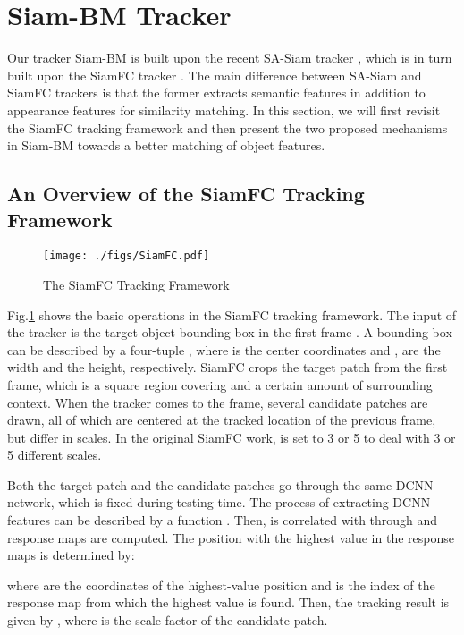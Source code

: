 \documentclass[runningheads]{llncs}
\begin{document}
\section{Siam-BM Tracker} \label{sec:Siam-BM}

Our tracker Siam-BM is built upon the recent SA-Siam tracker \cite{SASiam}, which is in turn built upon the SiamFC tracker \cite{SiamFC}. The main difference between SA-Siam and SiamFC trackers is that the former extracts semantic features in addition to appearance features for similarity matching. In this section, we will first revisit the SiamFC tracking framework and then present the two proposed mechanisms in Siam-BM towards a better matching of object features.

\subsection{An Overview of the SiamFC Tracking Framework}

\begin{figure}[th!]
    \begin{center}
    \texttt{[image: ./figs/SiamFC.pdf]}
    \end{center}
    \caption{The SiamFC Tracking Framework}
    \label{fig:siamFC}
\end{figure}

Fig.\ref{fig:siamFC} shows the basic operations in the SiamFC tracking framework. The input of the tracker is the target object bounding box  in the first frame . A bounding box can be described by a four-tuple , where  is the center coordinates and ,  are the width and the height, respectively. SiamFC crops the target patch  from the first frame, which is a square region covering  and a certain amount of surrounding context. When the tracker comes to the  frame, several candidate patches  are drawn, all of which are centered at the tracked location of the previous frame, but differ in scales. In the original SiamFC \cite{SiamFC} work,  is set to 3 or 5 to deal with 3 or 5 different scales. 

Both the target patch and the candidate patches go through the same DCNN network, which is fixed during testing time. The process of extracting DCNN features can be described by a function . Then,  is correlated with  through  and  response maps  are computed. The position with the highest value in the response maps is determined by:

where  are the coordinates of the highest-value position and  is the index of the response map from which the highest value is found. Then, the tracking result is given by , where  is the scale factor of the  candidate patch. 
\end{document}
